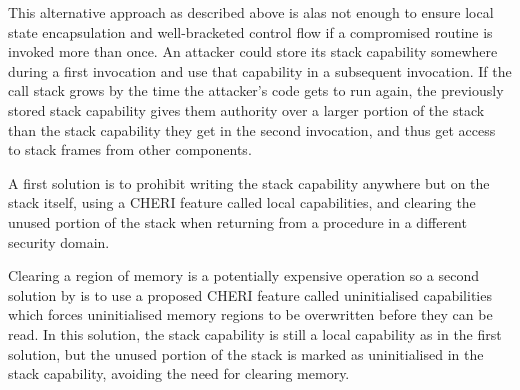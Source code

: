 \documentclass[main.tex]{subfiles}
\begin{document}
This alternative approach as described above is alas not enough to ensure local state encapsulation and well-bracketed control flow if a compromised routine is invoked more than once. An attacker could store its stack capability somewhere during a first invocation and use that capability in a subsequent invocation. If the call stack grows by the time the attacker’s code gets to run again, the previously stored stack capability gives them authority over a larger portion of the stack than the stack capability they get in the second invocation, and thus get access to stack frames from other components.

A first solution is to prohibit writing the stack capability anywhere but on the stack itself, using a CHERI feature called local capabilities, and clearing the unused portion of the stack when returning from a procedure in a different security domain.

Clearing a region of memory is a potentially expensive operation so a second solution by \cite{uninitcaps} is to use a proposed CHERI feature called uninitialised capabilities which forces uninitialised memory regions to be overwritten before they can be read. In this solution, the stack capability is still a local capability as in the first solution, but the unused portion of the stack is marked as uninitialised in the stack capability, avoiding the need for clearing memory.

\biblio{}
\onlyinsubfile{\glsaddall\printglossaries}
\end{document}
